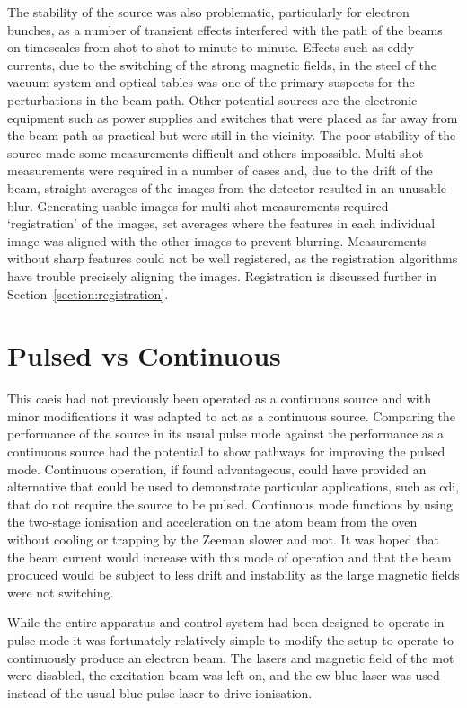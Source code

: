 The stability of the source was also problematic, particularly for electron bunches, as a number of transient effects interfered with the path of the beams on timescales from shot-to-shot to minute-to-minute.
Effects such as eddy currents, due to the switching of the strong magnetic fields, in the steel of the vacuum system and optical tables was one of the primary suspects for the perturbations in the beam path.
Other potential sources are the electronic equipment such as power supplies and switches that were placed as far away from the beam path as practical but were still in the vicinity.
The poor stability of the source made some measurements difficult and others impossible.
Multi-shot measurements were required in a number of cases and, due to the drift of the beam, straight averages of the images from the detector resulted in an unusable blur.
Generating usable images for multi-shot measurements required `registration' of the images, set averages where the features in each individual image was aligned with the other images to prevent blurring.
Measurements without sharp features could not be well registered, as the registration algorithms have trouble precisely aligning the images.
Registration is discussed further in Section~\ref{section:registration}.

\section{Pulsed vs Continuous}\label{section:pulse_vs_continuous}
This \gls{caeis} had not previously been operated as a continuous source and with minor modifications it was adapted to act as a continuous source.
Comparing the performance of the source in its usual pulse mode against the performance as a continuous source had the potential to show pathways for improving the pulsed mode.
Continuous operation, if found advantageous, could have provided an alternative that could be used to demonstrate particular applications, such as \gls{cdi}, that do not require the source to be pulsed.
Continuous mode functions by using the two-stage ionisation and acceleration on the atom beam from the oven without cooling or trapping by the Zeeman slower and \gls{mot}.
It was hoped that the beam current would increase with this mode of operation and that the beam produced would be subject to less drift and instability as the large magnetic fields were not switching.

While the entire apparatus and control system had been designed to operate in pulse mode it was fortunately relatively simple to modify the setup to operate to continuously produce an electron beam.
The lasers and magnetic field of the \gls{mot} were disabled, the excitation beam was left on, and the \gls{cw} blue laser was used instead of the usual blue pulse laser to drive ionisation.

